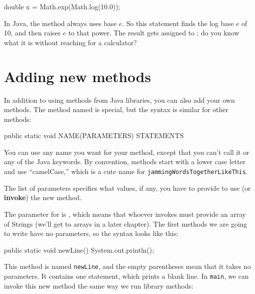 \begin{code}
    double x = Math.exp(Math.log(10.0));
\end{code}

In Java, the  method always uses base $e$.
So this statement finds the log base $e$ of 10, and then raises $e$ to that power.
The result gets assigned to ; do you know what it is without reaching for a calculator?

\section{Adding new methods}
\label{adding_methods}


In addition to using methods from Java libraries, you can also add your own methods.
The method named  is special, but the syntax is similar for other methods:

\begin{code}
    public static void NAME(PARAMETERS) {
        STATEMENTS
    }
\end{code}

You can use any name you want for your method, except that you can't call it  or any of the Java keywords.
By convention, methods start with a lower case letter and use ``camelCase,'' which is a cute name for {\tt jammingWordsTogetherLikeThis}.


The list of parameters specifies what values, if any, you have to provide to use (or {\bf invoke}) the new method.

The parameter for  is , which means that whoever invokes  must provide an array of Strings (we'll get to arrays in a later chapter).
The first methods we are going to write have no parameters, so the syntax looks like this:

\begin{code}
    public static void newLine() {
        System.out.println();
    }
\end{code}

This method is named {\tt newLine}, and the empty parentheses mean that it takes no parameters.
It contains one statement, which prints a blank line.
In {\tt main}, we can invoke this new method the same way we run library methods:

